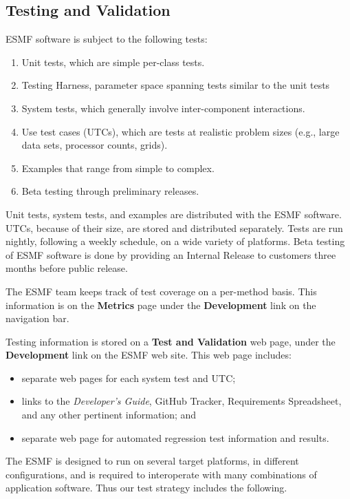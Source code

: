 
\subsection{Testing and Validation}
\label{sec:testing}

ESMF software is subject to the following tests:
\begin{enumerate}
\item Unit tests, which are simple per-class tests.
\item Testing Harness, parameter space spanning tests similar to the unit tests
\item System tests, which generally involve inter-component interactions.
\item Use test cases (UTCs), which are tests at realistic problem
sizes (e.g., large data sets, processor counts, grids).
\item Examples that range from simple to complex.
\item Beta testing through preliminary releases.
\end{enumerate}
Unit tests, system tests, and examples are distributed with the
ESMF software.  UTCs, because of their size, are 
stored and distributed separately.  Tests are run nightly,
following a weekly schedule, on a wide variety of platforms.  
Beta testing of ESMF software is done by providing an Internal Release
to customers three months before public release.  

The ESMF team keeps track of test coverage on a per-method basis.
This information is on the {\bf Metrics} page under the {\bf Development}
link on the navigation bar.

Testing information is stored on a {\bf Test and Validation} web page,
under the {\bf Development} link on the ESMF 
web site.  This web page includes:
\begin{itemize}
\item separate web pages for each system test and UTC;
\item links to the {\it Developer's Guide}, GitHub Tracker, Requirements 
Spreadsheet, and any other pertinent information; and
\item separate web page for automated regression test information and results.
\end{itemize}

The ESMF is designed to run on several target platforms, in different 
configurations, and is required to interoperate with many combinations 
of application software. Thus our test strategy includes the following.

